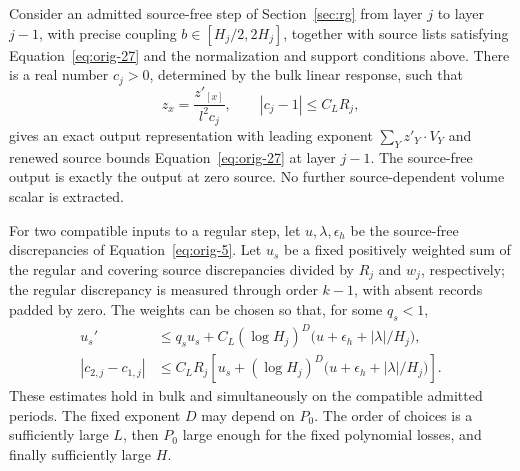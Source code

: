 \begin{proposition}
\label{prop:source-step}
Consider an admitted source-free step of Section~\ref{sec:rg} from
layer $j$ to layer $j-1$, with precise coupling
$b\in[H_j/2,2H_j]$, together with source lists satisfying
Equation~\eqref{eq:orig-27} and the normalization and support
conditions above.  There is a real number $c_j>0$, determined by the
bulk linear response, such that
\begin{equation}
 z_x=\frac{z'_{[x]}}{l^2c_j},
 \qquad |c_j-1|\le C_LR_j,
 \label{eq:orig-28}
\end{equation}
gives an exact output representation with leading exponent
$\sum_Yz'_Y\cdot V_Y$ and renewed source bounds
Equation~\eqref{eq:orig-27} at layer $j-1$.  The source-free output
is exactly the output at zero source.  No further source-dependent
volume scalar is extracted.

For two compatible inputs to a regular step, let $u,\lambda,
\epsilon_h$ be the source-free discrepancies of
Equation~\eqref{eq:orig-5}.  Let $u_s$ be a fixed positively weighted
sum of the regular and covering source discrepancies divided by
$R_j$ and $w_j$, respectively; the regular discrepancy is measured
through order $k-1$, with absent records padded by zero.  The weights
can be chosen so that, for some $q_s<1$,
\begin{equation}
 \begin{split}
 u_s'&\le q_su_s+
   C_L(\log H_j)^D
          \bigl(u+\epsilon_h+|\lambda|/H_j\bigr),\\
 |c_{2,j}-c_{1,j}|&\le C_LR_j
    \left[u_s+(\log H_j)^D
          \bigl(u+\epsilon_h+|\lambda|/H_j\bigr)\right].
 \end{split}
 \label{eq:orig-29}
\end{equation}
These estimates hold in bulk and simultaneously on the compatible
admitted periods.  The fixed exponent $D$ may depend on $P_0$.
The order of choices is a sufficiently large $L$, then $P_0$ large
enough for the fixed polynomial losses, and finally sufficiently
large $H$.
\end{proposition}

